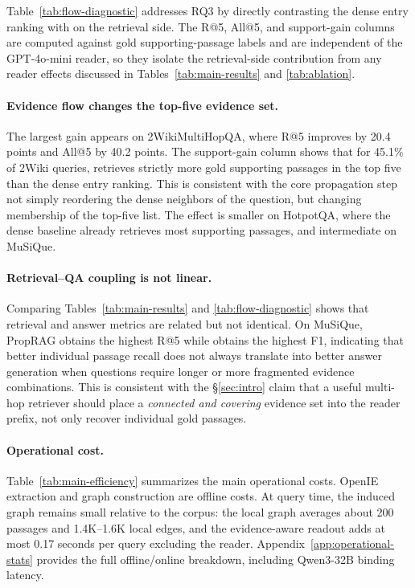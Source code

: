 Table~\ref{tab:flow-diagnostic} addresses RQ3 by directly contrasting
the dense entry ranking with \methodname{} on the retrieval side.
The R@5, All@5, and support-gain columns are computed against gold
supporting-passage labels and are independent of the GPT-4o-mini
reader, so they isolate the retrieval-side contribution from any
reader effects discussed in Tables~\ref{tab:main-results} and
\ref{tab:ablation}.
\paragraph{Evidence flow changes the top-five evidence set.}
The largest gain appears on 2WikiMultiHopQA, where R@5 improves by
20.4 points and All@5 by 40.2 points. The support-gain column shows
that for 45.1\% of 2Wiki queries, \methodname{} retrieves strictly
more gold supporting passages in the top five than the dense entry
ranking. This is consistent with the core propagation step not simply
reordering the dense neighbors of the question, but changing
membership of the top-five list. The effect is smaller on HotpotQA,
where the dense baseline already retrieves most supporting passages,
and intermediate on MuSiQue.

\paragraph{Retrieval--QA coupling is not linear.}
Comparing Tables~\ref{tab:main-results} and \ref{tab:flow-diagnostic}
shows that retrieval and answer metrics are related but not identical.
On MuSiQue, PropRAG obtains the highest R@5 while \methodname{} obtains
the highest F1, indicating that better individual passage recall does
not always translate into better answer generation when questions
require longer or more fragmented evidence combinations. This is
consistent with the \S\ref{sec:intro} claim that a useful multi-hop
retriever should place a \emph{connected and covering} evidence set
into the reader prefix, not only recover individual gold passages.

\paragraph{Operational cost.}
Table~\ref{tab:main-efficiency} summarizes the main operational costs.
OpenIE extraction and graph construction are offline costs. At query
time, the induced graph remains small relative to the corpus: the
local graph averages about 200 passages and 1.4K--1.6K local edges, and
the evidence-aware readout adds at most 0.17 seconds per query
excluding the reader. Appendix~\ref{app:operational-stats} provides the
full offline/online breakdown, including Qwen3-32B binding latency.

